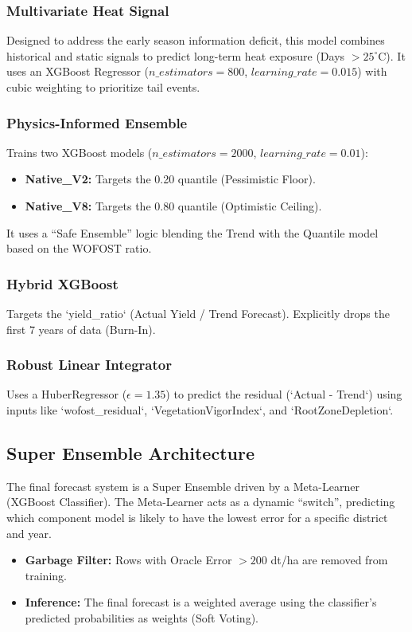 \subsubsection{Multivariate Heat Signal}
Designed to address the early season information deficit, this model combines historical and static signals to predict long-term heat exposure (Days $> 25^\circ$C). It uses an XGBoost Regressor ($n\_estimators=800$, $learning\_rate=0.015$) with cubic weighting to prioritize tail events.

\subsubsection{Physics-Informed Ensemble}
Trains two XGBoost models ($n\_estimators=2000$, $learning\_rate=0.01$):
\begin{itemize}
    \item \textbf{Native\_V2:} Targets the 0.20 quantile (Pessimistic Floor).
    \item \textbf{Native\_V8:} Targets the 0.80 quantile (Optimistic Ceiling).
\end{itemize}
It uses a ``Safe Ensemble'' logic blending the Trend with the Quantile model based on the WOFOST ratio.

\subsubsection{Hybrid XGBoost}
Targets the `yield\_ratio` (Actual Yield / Trend Forecast). Explicitly drops the first 7 years of data (Burn-In).

\subsubsection{Robust Linear Integrator}
Uses a HuberRegressor ($\epsilon=1.35$) to predict the residual (`Actual - Trend`) using inputs like `wofost\_residual`, `VegetationVigorIndex`, and `RootZoneDepletion`.

\subsection{Super Ensemble Architecture}
The final forecast system is a Super Ensemble driven by a Meta-Learner (XGBoost Classifier). The Meta-Learner acts as a dynamic ``switch'', predicting which component model is likely to have the lowest error for a specific district and year.
\begin{itemize}
    \item \textbf{Garbage Filter:} Rows with Oracle Error $> 200$ dt/ha are removed from training.
    \item \textbf{Inference:} The final forecast is a weighted average using the classifier's predicted probabilities as weights (Soft Voting).
\end{itemize}
